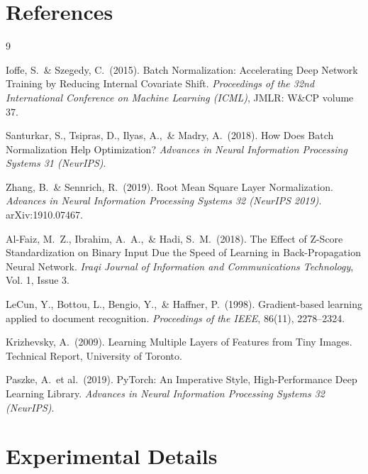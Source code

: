 \documentclass{article}
\begin{document}
\section*{References}

\begin{thebibliography}{9}

Ioffe, S.\ \& Szegedy, C.\ (2015).
Batch Normalization: Accelerating Deep Network Training by Reducing Internal Covariate Shift.
\textit{Proceedings of the 32nd International Conference on Machine Learning (ICML)},
JMLR: W\&CP volume 37.

Santurkar, S., Tsipras, D., Ilyas, A.,\ \& Madry, A.\ (2018).
How Does Batch Normalization Help Optimization?
\textit{Advances in Neural Information Processing Systems 31 (NeurIPS)}.

Zhang, B.\ \& Sennrich, R.\ (2019).
Root Mean Square Layer Normalization.
\textit{Advances in Neural Information Processing Systems 32 (NeurIPS 2019)}.
arXiv:1910.07467.

Al-Faiz, M.\ Z., Ibrahim, A.\ A.,\ \& Hadi, S.\ M.\ (2018).
The Effect of Z-Score Standardization on Binary Input Due the Speed of Learning in
Back-Propagation Neural Network.
\textit{Iraqi Journal of Information and Communications Technology}, Vol. 1, Issue 3.

LeCun, Y., Bottou, L., Bengio, Y.,\ \& Haffner, P.\ (1998).
Gradient-based learning applied to document recognition.
\textit{Proceedings of the IEEE}, 86(11), 2278--2324.

Krizhevsky, A.\ (2009).
Learning Multiple Layers of Features from Tiny Images.
Technical Report, University of Toronto.

Paszke, A.\ et al.\ (2019).
PyTorch: An Imperative Style, High-Performance Deep Learning Library.
\textit{Advances in Neural Information Processing Systems 32 (NeurIPS)}.

\end{thebibliography}


\appendix
\section{Experimental Details}
\end{document}
